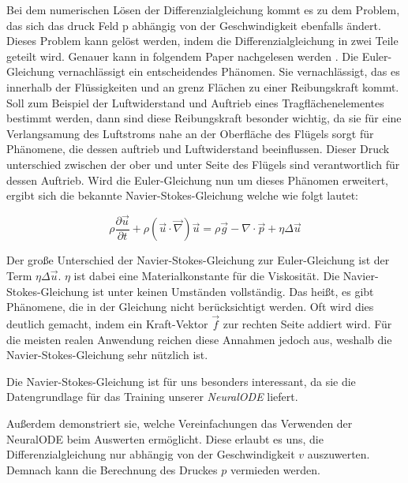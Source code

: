 Bei dem numerischen Lösen der Differenzialgleichung kommt es zu dem Problem, das sich das druck Feld p
abhängig von der Geschwindigkeit ebenfalls ändert.
Dieses Problem kann gelöst werden, indem die Differenzialgleichung in zwei Teile geteilt wird.
Genauer kann in folgendem Paper nachgelesen werden \cite{num_navier}.
Die Euler-Gleichung vernachlässigt ein entscheidendes Phänomen.
Sie vernachlässigt, das es innerhalb der Flüssigkeiten und an grenz Flächen zu einer Reibungskraft kommt.
Soll zum Beispiel der Luftwiderstand und Auftrieb eines Tragflächenelementes bestimmt werden,
dann sind diese Reibungskraft besonder wichtig, da sie für eine Verlangsamung des Luftstroms nahe an der Oberfläche
des Flügels sorgt für Phänomene, die dessen auftrieb und Luftwiderstand beeinflussen.
Dieser Druck unterschied zwischen der ober und unter Seite des Flügels sind verantwortlich für dessen Auftrieb.
Wird die Euler-Gleichung nun um dieses Phänomen erweitert, 
ergibt sich die bekannte Navier-Stokes-Gleichung \cite[Kapitel~1.4]{navier_stokes} 
welche wie folgt lautet:

$$
\rho \frac{\partial \vec{u}}{\partial t} + \rho (\vec{u} \cdot \vec{\nabla} ) \vec{u} = 
\rho \vec{g} - \nabla \cdot \vec{p} + \eta \Delta \vec{u}
$$

Der große Unterschied der Navier-Stokes-Gleichung zur Euler-Gleichung ist der Term $\eta \Delta \vec{u}$.
$\eta$ ist dabei eine Materialkonstante für die Viskosität.
Die Navier-Stokes-Gleichung ist unter keinen Umständen vollständig.
Das heißt, es gibt Phänomene, die in der Gleichung nicht berücksichtigt werden.
Oft wird dies deutlich gemacht, indem ein Kraft-Vektor $\vec{f}$ zur rechten Seite addiert wird.
Für die meisten realen Anwendung reichen diese Annahmen jedoch aus, weshalb die Navier-Stokes-Gleichung sehr nützlich ist.

Die Navier-Stokes-Gleichung ist für uns besonders interessant, da sie die Datengrundlage für das Training unserer \textit{NeuralODE} liefert.

Außerdem demonstriert sie, welche Vereinfachungen das Verwenden der NeuralODE beim Auswerten ermöglicht.
Diese erlaubt es uns, die Differenzialgleichung nur abhängig von der Geschwindigkeit $v$ auszuwerten.
Demnach kann die Berechnung des Druckes $p$ vermieden werden.

